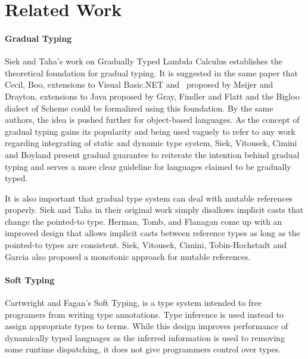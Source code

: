 \section{Related Work}

\paragraph{Gradual Typing}
Siek and Taha's work on Gradually Typed Lambda Calculus\cite{siek2006gradual}
establishes the theoretical foundation for gradual typing.
It is suggested in the same paper that Cecil\cite{chambers2004cecil}, Boo\cite{de2005boo},
extensions to Visual Basic.NET and \csharp\ proposed by Meijer and Drayton\cite{meijer2004static},
extensions to Java proposed by Gray, Findler and Flatt\cite{gray2005fine}
and the Bigloo \cite{bres2004compiling,serrano2002bigloo} dialect of Scheme\cite{abelson1998revised}
could be formalized using this foundation.
By the same authors,
the idea is pushed further for object-based languages\cite{siek2007gradual}.
As the concept of gradual typing gains its popularity and being used vaguely to
refer to any work regarding integrating of static and dynamic type system,
Siek, Vitousek, Cimini and Boyland present gradual guarantee\cite{siek2015refined}
to reiterate the intention behind gradual typing and serves a more clear guideline for
languages claimed to be gradually typed.

It is also important that gradual type system can deal with
mutable references properly.
Siek and Taha\cite{siek2006gradual} in their original work
simply disallows implicit casts that change the pointed-to type.
Herman, Tomb, and Flanagan\cite{herman2010space} come up with
an improved design that allows implicit casts between reference types
as long as the pointed-to types are consistent.
Siek, Vitousek, Cimini, Tobin-Hochstadt and Garcia\cite{siek2015monotonic}
also proposed a monotonic approach for mutable references.

\paragraph{Soft Typing}
Cartwright and Fagan's Soft Typing\cite{cartwright1991soft},
is a type system intended to free programers from writing type annotations.
Type inference is used instead to assign appropriate types to terms.
While this design improves performance of dynamically typed languages
as the inferred information is used to removing some runtime dispatching,
it does not give programmers control over types.

